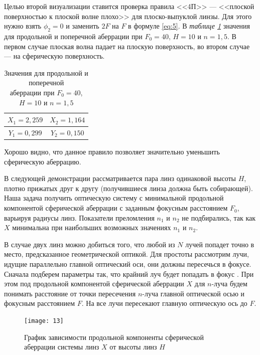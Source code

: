 \documentclass[a4paper, 12pt]{article}
\begin{document}
Целью второй визуализации ставится проверка правила <<4П>> --- <<плоской
поверхностью к плоской волне плохо>> для плоско-выпуклой линзы. Для этого нужно взять $\phi_2 = 0$
 и заменить $2F$ на $F$ в формуле
\eqref{eq:5}. В \textsl{таблице \ref{table:1}} значения для продольной и
поперечной аберрации при $F_0=40$, $H=10$ и $n=1,5$. В первом случае
плоская волна падает на плоскую поверхность, во втором случае --- на
сферическую поверхность.

\renewcommand{\arraystretch}{1.2}
\begin{table}[H]
\centering
\begin{tabular}{|c|c|}
    \hline 
    $X_1 = 2,259$ & $X_2 = 1,164$ \\ \hline 
    $Y_1 = 0,299$ & $Y_2 = 0,150$ \\ \hline 
\end{tabular}
\caption{Значения для продольной и
поперечной\\ аберрации при $F_0=40$, $H=10$ и $n=1,5$}
\label{table:1}
\end{table}

Хорошо видно, что данное правило позволяет значительно уменьшить
сферическую аберрацию.

В следующей демонстрации рассматривается пара линз одинаковой высоты
$H$, плотно прижатых
друг к другу (получившиеся линза должна быть собирающей). Наша задача получить оптическую
систему с минимальной продольной компонентой сферической аберрации с заданным фокусным
расстоянием $F_0$, варьируя радиусы линз. Показатели преломления $n_1$
и $n_2$ не подбирались, так как $X$ минимальна при наибольших
возможных значениях $n_1$ и $n_2$.

В случае двух линз можно добиться того, что любой из $N$ лучей
попадет точно в место, предсказанное геометрической оптикой. Для
простоты рассмотрим лучи, идущие параллельно главной оптический оси,
они должны пересечься в фокусе. Сначала подберем параметры так, что
крайний луч будет попадать в фокус . При этом под
продольной компонентой сферической аберрации $X$ для $n$-луча будем понимать
расстояние от точки пересечения $n$-луча главной оптической осью и
фокусным расстоянием $F$. На  все лучи пересекают главную
оптическую ось до $F$.
\begin{figure}[H]
    \texttt{[image: 13]} 
    \caption{График зависимости продольной компоненты сферической
аберрации системы линз $X$ от высоты линз $H$}
\label{fig:5}
\end{figure}
\end{document}
